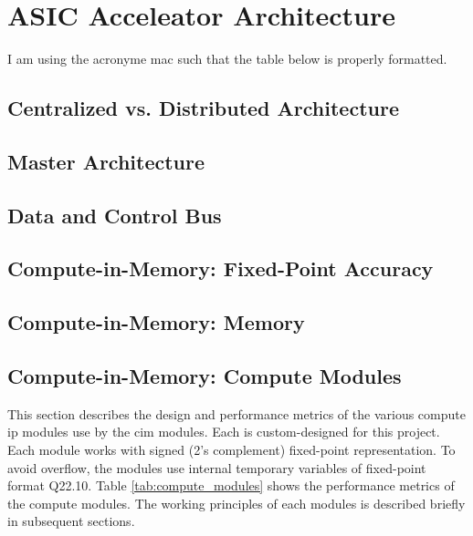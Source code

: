 \documentclass[12pt, hidelinks]{article}
\begin{document}
\section{ASIC Acceleator Architecture}
I am using the acronyme \ac{mac} such that the table below is properly formatted.
\lipsum[1]
\subsection{Centralized vs. Distributed Architecture}
\subsection{Master Architecture}
\subsection{Data and Control Bus}
\subsection{Compute-in-Memory: Fixed-Point Accuracy}
\subsection{Compute-in-Memory: Memory}
\subsection{Compute-in-Memory: Compute Modules}
This section describes the design and performance metrics of the various compute \ac{ip} modules use by the \ac{cim} modules. Each is custom-designed for this project.
Each module works with signed (2's complement) fixed-point representation. To avoid overflow, the modules use internal temporary variables of fixed-point format Q22.10.
Table \ref{tab:compute_modules} shows the performance metrics of the compute modules. The working principles of each modules is described briefly in subsequent sections.
\end{document}
